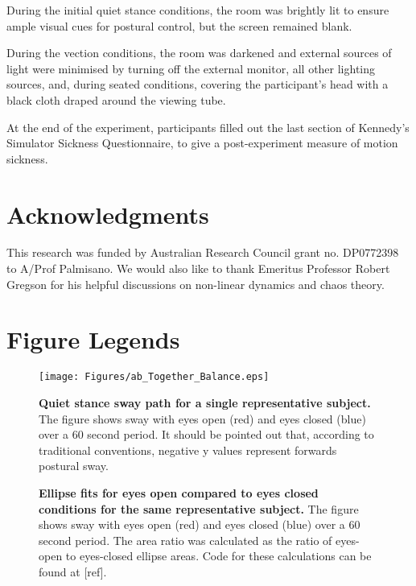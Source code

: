 \documentclass[11pt]{article}
\begin{document}
\begin{linenumbers}
During the initial quiet stance conditions, the room was brightly lit to ensure ample visual cues for postural control, but the screen remained blank. 
 
 During the vection conditions, the room was darkened and external sources of light were minimised by turning off the external monitor, all other lighting sources, and, during seated conditions, covering the participant's head with a black cloth draped around the viewing tube.
 
 At the end of the experiment, participants filled out the last section of Kennedy's Simulator Sickness Questionnaire, to give a post-experiment measure of motion sickness. 

\end{linenumbers}
\section*{Acknowledgments}
This research was funded by Australian Research Council grant no. DP0772398  to A/Prof Palmisano. We would also like to thank Emeritus Professor Robert Gregson for his helpful discussions on non-linear dynamics and chaos theory. 

\newpage

\newpage
\section*{Figure Legends}

\begin{figure}[!ht]
\begin{center}
\texttt{[image: Figures/ab\_Together\_Balance.eps]}
\end{center}
\caption{{\bf Quiet stance sway path for a single representative subject.} The figure shows sway with eyes open (red) and eyes closed (blue) over a 60 second period. It should be pointed out that, according to traditional conventions, negative y values represent forwards postural sway.}
\label{Figure_1}
\end{figure}


\begin{figure}[!ht]
\begin{center}
\end{center}
\caption{{\bf Ellipse fits for eyes open compared to eyes closed conditions for the same representative subject.} The figure shows sway with eyes open (red) and eyes closed (blue) over a 60 second period. The area ratio was calculated as the ratio of eyes-open to eyes-closed ellipse areas. Code for these calculations can be found at [ref].}
\label{Ellipses}
\end{figure}
\end{document}
